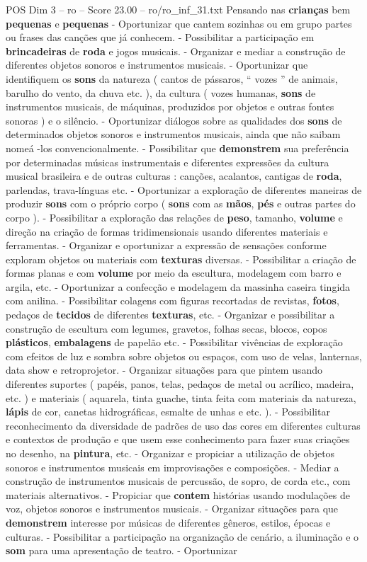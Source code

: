 \begin{textsample}{POS Dim 3 – ro – Score 23.00 – ro/ro\_inf\_31.txt}
Pensando nas \textbf{crianças} bem \textbf{pequenas} e \textbf{pequenas} - Oportunizar que cantem sozinhas ou em grupo partes ou frases das canções que já conhecem. - Possibilitar a participação em \textbf{brincadeiras} de \textbf{roda} e jogos musicais. - Organizar e mediar a construção de diferentes objetos sonoros e instrumentos musicais. - Oportunizar que identifiquem os \textbf{sons} da natureza ( cantos de pássaros, “ vozes ” de animais, barulho do vento, da chuva etc. ), da cultura ( vozes humanas, \textbf{sons} de instrumentos musicais, de máquinas, produzidos por objetos e outras fontes sonoras ) e o silêncio. - Oportunizar diálogos sobre as qualidades dos \textbf{sons} de determinados objetos sonoros e instrumentos musicais, ainda que não saibam nomeá -los convencionalmente. - Possibilitar que \textbf{demonstrem} sua preferência por determinadas músicas instrumentais e diferentes expressões da cultura musical brasileira e de outras culturas : canções, acalantos, cantigas de \textbf{roda}, parlendas, trava-línguas etc. - Oportunizar a exploração de diferentes maneiras de produzir \textbf{sons} com o próprio corpo ( \textbf{sons} com as \textbf{mãos}, \textbf{pés} e outras partes do corpo ). - Possibilitar a exploração das relações de \textbf{peso}, tamanho, \textbf{volume} e direção na criação de formas tridimensionais usando diferentes materiais e ferramentas. - Organizar e oportunizar a expressão de sensações conforme exploram objetos ou materiais com \textbf{texturas} diversas. - Possibilitar a criação de formas planas e com \textbf{volume} por meio da escultura, modelagem com barro e argila, etc. - Oportunizar a confecção e modelagem da massinha caseira tingida com anilina. - Possibilitar colagens com figuras recortadas de revistas, \textbf{fotos}, pedaços de \textbf{tecidos} de diferentes \textbf{texturas}, etc. - Organizar e possibilitar a construção de escultura com legumes, gravetos, folhas secas, blocos, copos \textbf{plásticos}, \textbf{embalagens} de papelão etc. - Possibilitar vivências de exploração com efeitos de luz e sombra sobre objetos ou espaços, com uso de velas, lanternas, data show e retroprojetor. - Organizar situações para que pintem usando diferentes suportes ( papéis, panos, telas, pedaços de metal ou acrílico, madeira, etc. ) e materiais ( aquarela, tinta guache, tinta feita com materiais da natureza, \textbf{lápis} de cor, canetas hidrográficas, esmalte de unhas e etc. ). - Possibilitar reconhecimento da diversidade de padrões de uso das cores em diferentes culturas e contextos de produção e que usem esse conhecimento para fazer suas criações no desenho, na \textbf{pintura}, etc. - Organizar e propiciar a utilização de objetos sonoros e instrumentos musicais em improvisações e composições. - Mediar a construção de instrumentos musicais de percussão, de sopro, de corda etc., com materiais alternativos. - Propiciar que \textbf{contem} histórias usando modulações de voz, objetos sonoros e instrumentos musicais. - Organizar situações para que \textbf{demonstrem} interesse por músicas de diferentes gêneros, estilos, épocas e culturas. - Possibilitar a participação na organização de cenário, a iluminação e o \textbf{som} para uma apresentação de teatro. - Oportunizar 
\end{textsample}
